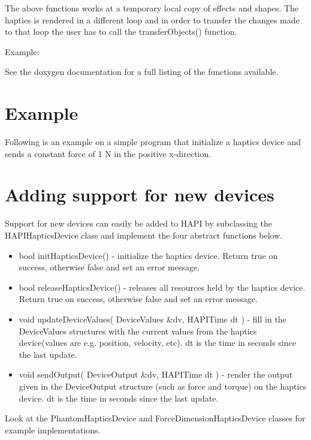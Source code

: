 The above functions works at a temporary local copy of effects and
shapes. The haptics is rendered in a different loop and in order to
transfer the changes made to that loop the user has to call the
transferObjects() function. 

Example:



See the doxygen documentation for a full listing of the functions
available. 

\section{Example}
Following is an example on a simple program that initialize a haptics
device and sends a constant force of 1 N in the positive x-direction.

 

\section{Adding support for new devices}
\label{ssAddingHapticsSupport}

Support for new devices can easily be added to HAPI by subclassing the
HAPIHapticsDevice class and implement the four abstract functions below.

\begin{itemize}
\item bool initHapticsDevice() - initialize the haptics device. Return
  true on success, otherwise false and set an error message. 
\item bool releaseHapticsDevice() - releases all resources held by the
  haptics device. Return true on success, otherwise false and set an
  error message. 
\item void updateDeviceValues( DeviceValues \&dv, HAPITime dt ) - fill
  in the DeviceValues structures with the current values from the
  haptics device(values are e.g. position, velocity, etc). dt is the
  time in seconds since the last update.
\item void sendOutput( DeviceOutput \&dv, HAPITime dt ) - render the
  output given in the DeviceOutput structure (such as force and torque)
  on the haptics device. dt is the time in seconds since the last update.
\end{itemize}

Look at the PhantomHapticsDevice and ForceDimensionHapticsDevice classes for
example implementations. 

